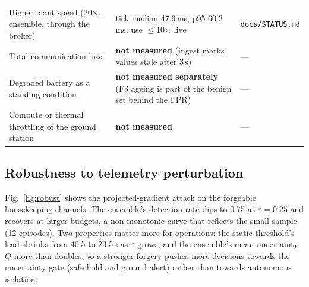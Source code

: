 \documentclass[10pt,a4paper]{article}
\newcommand{\file}[1]{\texttt{#1}}
\begin{document}
\begin{table}[ht]
\begin{tabular}{@{}>{\raggedright\arraybackslash}p{}>{\raggedright\arraybackslash}p{}>{\raggedright\arraybackslash}p{}@{}}
Higher plant speed (20$\times$, ensemble, through the broker) & tick median 47.9\,ms, p95 60.3\,ms; use $\le$10$\times$ live & \file{docs/STATUS.md} \\
Total communication loss & \textbf{not measured} (ingest marks values stale after 3\,s) & --- \\
Degraded battery as a standing condition & \textbf{not measured separately} (F3 ageing is part of the benign set behind the FPR) & --- \\
Compute or thermal throttling of the ground station & \textbf{not measured} & --- \\
\bottomrule
\end{tabular}
\end{table}

\subsection{Robustness to telemetry perturbation}
Fig.~\ref{fig:robust} shows the projected-gradient attack on the forgeable housekeeping channels. The
ensemble's detection rate dips to 0.75 at $\varepsilon=0.25$ and recovers at larger budgets, a
non-monotonic curve that reflects the small sample (12 episodes). Two properties matter more for
operations: the static threshold's lead shrinks from 40.5 to 23.5\,s as $\varepsilon$ grows, and the
ensemble's mean uncertainty $Q$ more than doubles, so a stronger forgery pushes more decisions towards
the uncertainty gate (safe hold and ground alert) rather than towards autonomous isolation.
\end{document}
